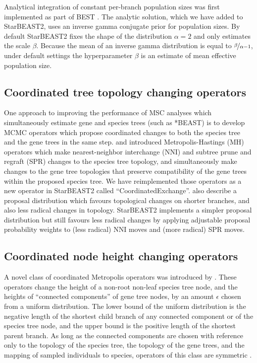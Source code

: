 \documentclass[12pt]{article}
\begin{document}
Analytical integration of constant per-branch population sizes was first
implemented as part of BEST \citep{EVO:EVO414}. The analytic solution, which
we have added to StarBEAST2, uses an inverse gamma conjugate prior for
population sizes. By default StarBEAST2 fixes the shape of the distribution
$\alpha = 2$ and only estimates the scale $\beta$. Because the mean of an
inverse gamma distribution is equal to $\nicefrac{\beta}{\alpha - 1}$, under default
settings the hyperparameter $\beta$ is an estimate of mean effective
population size.

\subsection*{Coordinated tree topology changing operators}

One approach to improving the performance of MSC analyses which simultaneously
estimate gene and species trees (such as *BEAST) is to develop MCMC operators
which propose coordinated changes to both the species tree and the gene trees in
the same step. \cite{Yang01122014} and \cite{2015arXiv151203843R} introduced
Metropolis-Hastings (MH) operators which make nearest-neighbor interchange (NNI) and subtree prune and regraft (SPR) changes to the species
tree topology, and simultaneously make changes to the gene tree topologies that
preserve compatibility of the gene trees within the proposed species tree. We have
reimplemented those operators as a new operator in StarBEAST2 called
``CoordinatedExchange''. \cite{2015arXiv151203843R} also describe a proposal
distribution which favours topological changes on shorter branches, and also
less radical changes in topology. StarBEAST2 implements a simpler proposal
distribution but still favours less radical changes by applying adjustable
proposal probability weights to (less radical) NNI moves and (more radical) SPR
moves.

\subsection*{Coordinated node height changing operators}

A novel class of coordinated Metropolis operators was introduced by
\cite{Jones010199}. These operators change the height of a non-root non-leaf
species tree node, and the heights of ``connected components'' of gene tree
nodes, by an amount $\epsilon$ chosen from a uniform distribution.
The lower bound of the uniform distribution is the negative length of
the shortest child branch of any connected component or of the species tree node,
and the upper bound is the positive length of the shortest parent branch. As
long as the connected components are chosen with reference only to the topology
of the species tree, the topology of the gene trees, and the mapping of
sampled individuals to species, operators of this class are symmetric
\citep{Jones010199}.
\end{document}
